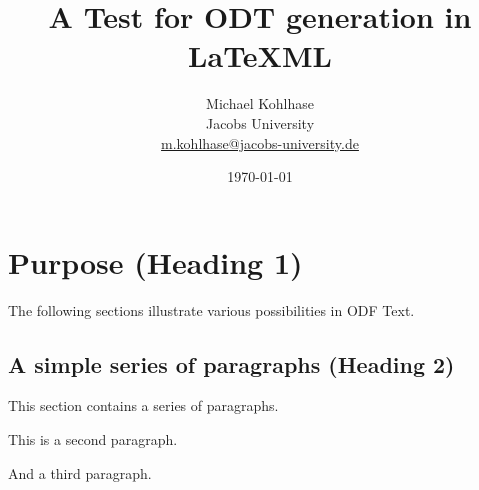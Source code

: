 \documentclass{article}
\title{A Test for ODT generation in LaTeXML}
\author{Michael Kohlhase\\Jacobs University\\\url{m.kohlhase@jacobs-university.de}}
\date{\today}
\begin{document}
\maketitle

\section{Purpose (Heading 1)}

The following sections illustrate various possibilities in ODF Text.

\subsection{A simple series of paragraphs (Heading 2)}

This section contains a series of paragraphs.

This is a second paragraph.

And a third paragraph.


\end{document}
